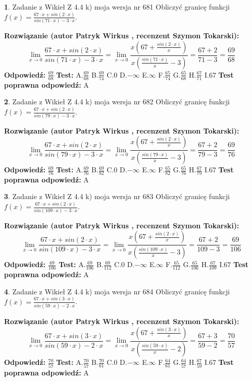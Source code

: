 \documentclass[12pt, a4paper]{article}
\theoremstyle{definition} %
\newtheorem{zad}{}
\newcommand{\zadStart}[1]{\begin{zad}#1\newline}
\newcommand{\zadStop}{\end{zad}}
\newcommand{\rozwStart}[2]{\noindent \textbf{Rozwiązanie (autor #1 , recenzent #2): }\newline}
\newcommand{\rozwStop}{\newline}
\newcommand{\odpStart}{\noindent \textbf{Odpowiedź:}\newline}
\newcommand{\odpStop}{\newline}
\newcommand{\testStart}{\noindent \textbf{Test:}\newline}
\newcommand{\testStop}{\newline}
\newcommand{\kluczStart}{\noindent \textbf{Test poprawna odpowiedź:}\newline}
\newcommand{\kluczStop}{\newline}
\begin{document}
\zadStart{Zadanie z Wikieł Z 4.4 k) moja wersja nr 681}
Obliczyć granicę funkcji $f(x)=\frac{67\cdot x +sin(2\cdot x)}{sin(71\cdot x) -3\cdot x}$.
\zadStop
\rozwStart{Patryk Wirkus}{Szymon Tokarski}
$$\lim\limits_{x\to 0}\frac{67\cdot x +sin(2\cdot x)}{sin(71\cdot x) -3\cdot x}
=\lim\limits_{x\to 0}\frac{x(67+\frac{sin(2\cdot x)}{x})}{x(\frac{sin(71\cdot x)}{x}-3)}
=\frac{67+2}{71-3} = \frac{69}{68}$$
\rozwStop
\odpStart
$\frac{69}{68}$
\odpStop
\testStart
A.$\frac{69}{68}$
B.$\frac{69}{74}$
C.$0$
D.$-\infty$
E.$\infty$
F.$\frac{65}{74}$
G.$\frac{65}{68}$
H.$\frac{67}{71}$
I.$67$
\testStop
\kluczStart
A
\kluczStop



\zadStart{Zadanie z Wikieł Z 4.4 k) moja wersja nr 682}
Obliczyć granicę funkcji $f(x)=\frac{67\cdot x +sin(2\cdot x)}{sin(79\cdot x) -3\cdot x}$.
\zadStop
\rozwStart{Patryk Wirkus}{Szymon Tokarski}
$$\lim\limits_{x\to 0}\frac{67\cdot x +sin(2\cdot x)}{sin(79\cdot x) -3\cdot x}
=\lim\limits_{x\to 0}\frac{x(67+\frac{sin(2\cdot x)}{x})}{x(\frac{sin(79\cdot x)}{x}-3)}
=\frac{67+2}{79-3} = \frac{69}{76}$$
\rozwStop
\odpStart
$\frac{69}{76}$
\odpStop
\testStart
A.$\frac{69}{76}$
B.$\frac{69}{82}$
C.$0$
D.$-\infty$
E.$\infty$
F.$\frac{65}{82}$
G.$\frac{65}{76}$
H.$\frac{67}{79}$
I.$67$
\testStop
\kluczStart
A
\kluczStop



\zadStart{Zadanie z Wikieł Z 4.4 k) moja wersja nr 683}
Obliczyć granicę funkcji $f(x)=\frac{67\cdot x +sin(2\cdot x)}{sin(109\cdot x) -3\cdot x}$.
\zadStop
\rozwStart{Patryk Wirkus}{Szymon Tokarski}
$$\lim\limits_{x\to 0}\frac{67\cdot x +sin(2\cdot x)}{sin(109\cdot x) -3\cdot x}
=\lim\limits_{x\to 0}\frac{x(67+\frac{sin(2\cdot x)}{x})}{x(\frac{sin(109\cdot x)}{x}-3)}
=\frac{67+2}{109-3} = \frac{69}{106}$$
\rozwStop
\odpStart
$\frac{69}{106}$
\odpStop
\testStart
A.$\frac{69}{106}$
B.$\frac{69}{112}$
C.$0$
D.$-\infty$
E.$\infty$
F.$\frac{65}{112}$
G.$\frac{65}{106}$
H.$\frac{67}{109}$
I.$67$
\testStop
\kluczStart
A
\kluczStop



\zadStart{Zadanie z Wikieł Z 4.4 k) moja wersja nr 684}
Obliczyć granicę funkcji $f(x)=\frac{67\cdot x +sin(3\cdot x)}{sin(59\cdot x) -2\cdot x}$.
\zadStop
\rozwStart{Patryk Wirkus}{Szymon Tokarski}
$$\lim\limits_{x\to 0}\frac{67\cdot x +sin(3\cdot x)}{sin(59\cdot x) -2\cdot x}
=\lim\limits_{x\to 0}\frac{x(67+\frac{sin(3\cdot x)}{x})}{x(\frac{sin(59\cdot x)}{x}-2)}
=\frac{67+3}{59-2} = \frac{70}{57}$$
\rozwStop
\odpStart
$\frac{70}{57}$
\odpStop
\testStart
A.$\frac{70}{57}$
B.$\frac{70}{61}$
C.$0$
D.$-\infty$
E.$\infty$
F.$\frac{64}{61}$
G.$\frac{64}{57}$
H.$\frac{67}{59}$
I.$67$
\testStop
\kluczStart
A
\kluczStop
\end{document}
